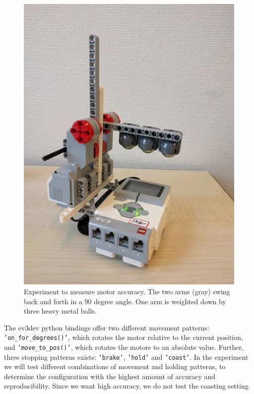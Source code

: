 \documentclass[11pt, a4paper]{article}
\begin{document}
\begin{figure}
\centering
\includegraphics[width=0.35\linewidth]{images/angle_experiment}
\caption{Experiment to measure motor accuracy. The two arms (gray) swing back and forth in a 90 degree angle. One arm is weighted down by three heavy metal balls.}
\label{fig:angle_experiment}
\end{figure}



The ev3dev python bindings offer two different movement patterns: \texttt{'on\_for\_degrees()'}, which rotates the motor relative to the current position, and \texttt{'move\_to\_pos()'}, which rotates the motors to an absolute value.  Further, three stopping patterns exists: \texttt{'brake'}, \texttt{'hold'} and \texttt{'coast'}. In the experiment we will test different combinations of movement and holding patterns, to determine the configuration with the highest amount of accuracy and reproducibility. Since we want high accuracy, we do not test the coasting setting. 
\end{document}
